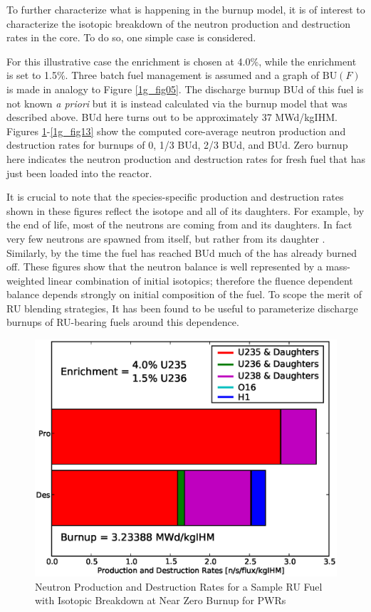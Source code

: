To further characterize what is happening in the burnup model, it is of interest to characterize 
the isotopic breakdown of the neutron production and destruction rates in the core.  To do so, one 
simple case is considered.

For this illustrative case the  enrichment is chosen at 4.0\%, while the  
enrichment is set to 1.5\%.  Three batch fuel management is assumed and a graph of $\mbox{BU}(F)$ 
is made in analogy to Figure \ref{1g_fig05}.  The discharge burnup BUd of this fuel is not known 
\emph{a priori} but it is instead calculated via the burnup model that was described above.  
BUd here turns out to be approximately 37 MWd/kgIHM.  Figures \ref{1g_fig10}-\ref{1g_fig13} show the 
computed core-average neutron production and destruction rates for burnups of 0, 1/3 BUd, 2/3 BUd, and BUd.  
Zero burnup here indicates the neutron production and destruction rates for fresh fuel that has just been 
loaded into the reactor.  

It is crucial to note that the species-specific production and destruction rates shown in these 
figures reflect the isotope and all of its daughters.  For example, by the end of life, most of 
the neutrons are coming from  and its daughters.  In fact very few neutrons are spawned from 
 itself, but rather from its daughter .  Similarly, by the time the fuel has 
reached BUd much of the  has already burned off.  These figures show that the neutron 
balance is well represented by a mass-weighted linear combination of initial isotopics; therefore 
the fluence dependent balance depends strongly on initial composition of the fuel.  To scope the 
merit of RU blending strategies, It has been found to be useful to parameterize discharge burnups 
of RU-bearing fuels around this dependence.

\begin{figure}[htbp]
\caption{Neutron Production and Destruction Rates for a Sample RU Fuel with Isotopic Breakdown at Near Zero Burnup for PWRs}
\label{1g_fig10}
\begin{center}
\includegraphics[scale=0.5]{one_group_method/figs/Fig10.eps}
\end{center}
\end{figure}

